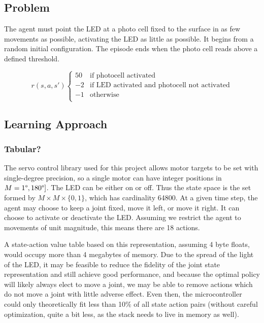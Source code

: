 \documentclass{article}
\begin{document}
	\subsection{Problem}
	
	The agent must point the LED at a photo cell fixed to the surface in as few movements as possible, activating the LED as little as possible. It begins from a random initial configuration. The episode ends when the photo cell reads above a defined threshold. 
	
	\[ r(s,a,s')  \left\{
	\begin{array}{ll}
		50 & \text{if photocell activated} \\
		-2 & \text{if LED activated and photocell not activated} \\
		-1 & \text{otherwise} \\
	\end{array} 
	\right. \]
	
	
	\subsection{Learning Approach}
	
	\subsubsection{Tabular?}
	
	The servo control library used for this project allows motor targets to be set with single-degree precision, so a single motor can have integer positions in $M = {1\degree, 180\degree]}$. The LED can be either on or off. Thus the state space is the set formed by $M \times M \times \{0,1\}$, which has cardinality 64800. At a given time step, the agent may choose to keep a joint fixed, move it left, or move it right. It can choose to activate or deactivate the LED. Assuming we restrict the agent to movements of unit magnitude, this means there are 18 actions.

	A state-action value table based on this representation, assuming 4 byte floats, would occupy more than 4 megabytes of memory. Due to the spread of the light of the LED, it may be feasible to reduce the fidelity of the joint state representation and still achieve good performance, and because the optimal policy will likely always elect to move a joint, we may be able to remove actions which do not move a joint with little adverse effect. Even then, the microcontroller could only theoretically fit less than 10\% of all state action pairs (without careful optimization, quite a bit less, as the stack needs to live in memory as well).
	
\end{document}
